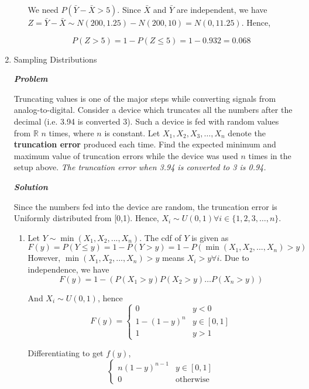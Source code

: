 \documentclass[12pt, oneside]{article}
\begin{document}
\begin{enumerate}
\begin{enumerate}
    We need $P(\bar Y-\bar X>5)$. Since $\bar X$ and $\bar Y$ are independent, we have $Z = \bar Y - \bar X \sim N(200,1.25) - N(200,10) = N(0,11.25)$. Hence, 
    
    \[ P(Z>5) = 1- P(Z\le 5) = 1-0.932 = 0.068 \]
    
\end{enumerate}




\item	Sampling Distributions 

\textit{\textbf{Problem}}

Truncating values is one of the major steps while converting signals from analog-to-digital. Consider a device which truncates all the numbers after the decimal (i.e. 3.94 is converted 3). Such a device is fed with random values from $\mathbb{R}$ $n$ times, where $n$ is constant. Let $X_1,X_2,X_3,\dots,X_n$ denote the \textbf{truncation error} produced each time. Find the expected minimum and maximum value of truncation errors while the device was used $n$ times in the setup above. \textit{The truncation error when 3.94 is converted to 3 is 0.94.}

\textit{\textbf{Solution}}

Since the numbers fed into the device are random, the truncation error is Uniformly distributed from [0,1). Hence, $X_i \sim U(0,1) \forall i \in \{1,2,3,\dots,n\}$.

\begin{enumerate}
    \item 
    Let $Y \sim \min(X_1,X_2,...,X_n)$. The cdf of $Y$ is given as
    \[ F(y) = P(Y \le y) = 1 - P(Y > y) = 1 - P(\min(X_1,X_2,...,X_n) > y)\]
    However, $\min(X_1,X_2,...,X_n) > y$ means $X_i>y \forall i$. Due to independence, we have
    \[ F(y) = 1 -( P(X_1 > y)P(X_2 > y)\dots P(X_n > y) ) \]
    
    And $X_i \sim U(0,1)$, hence 
    \[ 
    F(y) = 
    \begin{cases}
        0 & y <0 \\
        1 - (1-y)^n & y \in [0,1] \\
        1 & y>1
    \end{cases}
    \]
    
    Differentiating to get $f(y)$,
    \[\begin{cases}
        n(1-y)^{n-1} & y \in [0,1] \\
        0 & \text{otherwise}
    \end{cases}
    \]
    

\end{enumerate}
\end{enumerate}
\end{document}
